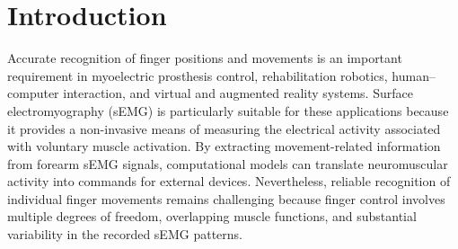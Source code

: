 \documentclass[preprint,12pt]{elsarticle}
\begin{document}


\section{Introduction}
Accurate recognition of finger positions and movements is an important requirement in myoelectric prosthesis control, rehabilitation robotics, human–computer interaction, and virtual and augmented reality systems. Surface electromyography (sEMG) is particularly suitable for these applications because it provides a non-invasive means of measuring the electrical activity associated with voluntary muscle activation. By extracting movement-related information from forearm sEMG signals, computational models can translate neuromuscular activity into commands for external devices. Nevertheless, reliable recognition of individual finger movements remains challenging because finger control involves multiple degrees of freedom, overlapping muscle functions, and substantial variability in the recorded sEMG patterns.

\end{document}
